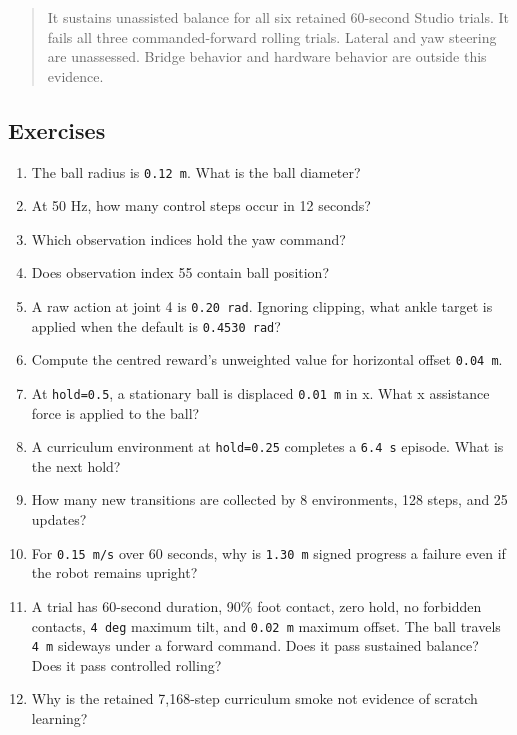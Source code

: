 \documentclass[
  american,
  11pt,
  letterpaper,
]{article}
\providecommand{\tightlist}{%
  \setlength{\itemsep}{0pt}\setlength{\parskip}{0pt}}
\begin{document}
\begin{quote}
It sustains unassisted balance for all six retained 60-second Studio
trials. It fails all three commanded-forward rolling trials. Lateral and
yaw steering are unassessed. Bridge behavior and hardware behavior are
outside this evidence.
\end{quote}

\subsection{Exercises}\label{exercises-1}

\begin{enumerate}
\def\labelenumi{\arabic{enumi}.}
\tightlist
\item
  The ball radius is \texttt{0.12\ m}. What is the ball diameter?
\item
  At 50 Hz, how many control steps occur in 12 seconds?
\item
  Which observation indices hold the yaw command?
\item
  Does observation index 55 contain ball position?
\item
  A raw action at joint 4 is \texttt{0.20\ rad}. Ignoring clipping, what
  ankle target is applied when the default is \texttt{0.4530\ rad}?
\item
  Compute the centred reward's unweighted value for horizontal offset
  \texttt{0.04\ m}.
\item
  At \texttt{hold=0.5}, a stationary ball is displaced \texttt{0.01\ m}
  in x. What x assistance force is applied to the ball?
\item
  A curriculum environment at \texttt{hold=0.25} completes a
  \texttt{6.4\ s} episode. What is the next hold?
\item
  How many new transitions are collected by 8 environments, 128 steps,
  and 25 updates?
\item
  For \texttt{0.15\ m/s} over 60 seconds, why is \texttt{1.30\ m} signed
  progress a failure even if the robot remains upright?
\item
  A trial has 60-second duration, 90\% foot contact, zero hold, no
  forbidden contacts, \texttt{4\ deg} maximum tilt, and \texttt{0.02\ m}
  maximum offset. The ball travels \texttt{4\ m} sideways under a
  forward command. Does it pass sustained balance? Does it pass
  controlled rolling?
\item
  Why is the retained 7,168-step curriculum smoke not evidence of
  scratch learning?
\end{enumerate}
\end{document}
